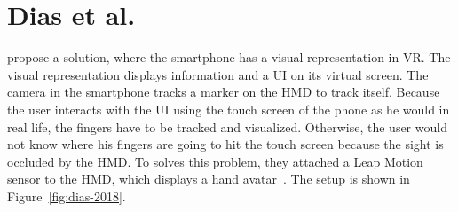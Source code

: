 \section{Dias et al.}\label{section:dias-2018}
\citeauthor{Dias.2018} propose a solution, where the smartphone has a visual representation in \ac{VR}. The visual representation displays information and a \ac{UI} on its virtual screen. The camera in the smartphone tracks a marker on the \ac{HMD} to track itself. Because the user interacts with the \ac{UI} using the touch screen of the phone as he would in real life, the fingers have to be tracked and visualized. Otherwise, the user would not know where his fingers are going to hit the touch screen because the sight is occluded by the \ac{HMD}. To solves this problem, they attached a Leap Motion sensor to the \ac{HMD}, which displays a hand avatar~\cite{Dias.2018}. The setup is shown in Figure~\ref{fig:dias-2018}. 


